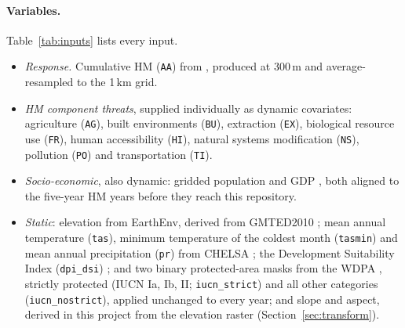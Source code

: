 \documentclass[11pt,a4paper]{article}
\newcommand{\code}[1]{\texttt{\small #1}}
\begin{document}
\paragraph{Variables.} Table~\ref{tab:inputs} lists every input.
\begin{itemize}
\item \emph{Response.} Cumulative HM (\code{AA}) from \citet{theobald}, produced at 300\,m and
  average-resampled to the 1\,km grid.
\item \emph{HM component threats}, supplied individually as dynamic covariates: agriculture
  (\code{AG}), built environments (\code{BU}), extraction (\code{EX}), biological resource use
  (\code{FR}), human accessibility (\code{HI}), natural systems modification (\code{NS}),
  pollution (\code{PO}) and transportation (\code{TI}).
\item \emph{Socio-economic}, also dynamic: gridded population \citep{zhuang} and GDP
  \citep{murakami}, both aligned to the five-year HM years before they reach this repository.
\item \emph{Static}: elevation from EarthEnv, derived from GMTED2010 \citep{amatulli}; mean annual
  temperature (\code{tas}), minimum temperature of the coldest month (\code{tasmin}) and mean
  annual precipitation (\code{pr}) from CHELSA \citep{karger}; the Development Suitability Index
  (\code{dpi\_dsi}) \citep{oakleaf2024}; and two binary protected-area masks from the WDPA
  \citep{wdpa}, strictly protected (IUCN Ia, Ib, II; \code{iucn\_strict}) and all other
  categories (\code{iucn\_nostrict}), applied unchanged to every year; and slope and aspect,
  derived in this project from the elevation raster (Section~\ref{sec:transform}).
\end{itemize}
\end{document}

